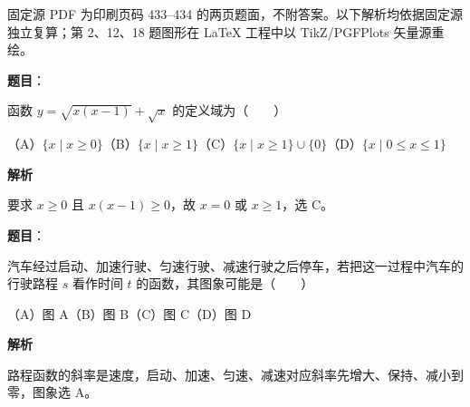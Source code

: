 

\begin{gktip}
固定源 PDF 为印刷页码 433–434 的两页题面，不附答案。以下解析均依据固定源独立复算；第 2、12、18 题图形在 LaTeX 工程中以 TikZ/PGFPlots 矢量源重绘。
\end{gktip}

\begin{answer}

\textbf{题目}：

函数 $y=\sqrt{x(x-1)}+\sqrt{x}$ 的定义域为\mbox{（　　）}

（A）$\{x\mid x\geqslant0\}$\quad（B）$\{x\mid x\geqslant1\}$\quad（C）$\{x\mid x\geqslant1\}\cup\{0\}$\quad（D）$\{x\mid0\leqslant x\leqslant1\}$

\textbf{解析}

要求 $x\geqslant0$ 且 $x(x-1)\geqslant0$，故 $x=0$ 或 $x\geqslant1$，选 C。


\end{answer}
\begin{answer}

\textbf{题目}：

汽车经过启动、加速行驶、匀速行驶、减速行驶之后停车，若把这一过程中汽车的行驶路程 $s$ 看作时间 $t$ 的函数，其图象可能是\mbox{（　　）}
\nopagebreak[4]
\begin{center}\end{center}
\nopagebreak[4]
（A）图 A\quad（B）图 B\quad（C）图 C\quad（D）图 D

\textbf{解析}

路程函数的斜率是速度，启动、加速、匀速、减速对应斜率先增大、保持、减小到零，图象选 A。


\end{answer}
